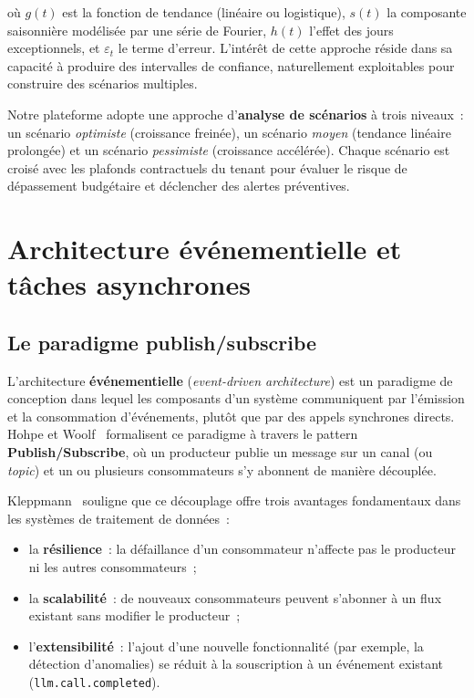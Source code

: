 \noindent où $g(t)$ est la fonction de tendance (linéaire ou logistique), $s(t)$ la composante saisonnière modélisée par une série de Fourier, $h(t)$ l'effet des jours exceptionnels, et $\varepsilon_t$ le terme d'erreur. L'intérêt de cette approche réside dans sa capacité à produire des intervalles de confiance, naturellement exploitables pour construire des scénarios multiples.

Notre plateforme adopte une approche d'\textbf{analyse de scénarios} à trois niveaux~: un scénario \textit{optimiste} (croissance freinée), un scénario \textit{moyen} (tendance linéaire prolongée) et un scénario \textit{pessimiste} (croissance accélérée). Chaque scénario est croisé avec les plafonds contractuels du tenant pour évaluer le risque de dépassement budgétaire et déclencher des alertes préventives.


\section{Architecture événementielle et tâches asynchrones}
\label{sec:eventdriven}

\subsection{Le paradigme publish/subscribe}

L'architecture \textbf{événementielle} (\textit{event-driven architecture}) est un paradigme de conception dans lequel les composants d'un système communiquent par l'émission et la consommation d'événements, plutôt que par des appels synchrones directs. Hohpe et Woolf~\cite{hohpe2003} formalisent ce paradigme à travers le pattern \textbf{Publish/Subscribe}, où un producteur publie un message sur un canal (ou \textit{topic}) et un ou plusieurs consommateurs s'y abonnent de manière découplée.

Kleppmann~\cite{kleppmann2017} souligne que ce découplage offre trois avantages fondamentaux dans les systèmes de traitement de données~:

\begin{itemize}[noitemsep]
    \item la \textbf{résilience}~: la défaillance d'un consommateur n'affecte pas le producteur ni les autres consommateurs~;
    \item la \textbf{scalabilité}~: de nouveaux consommateurs peuvent s'abonner à un flux existant sans modifier le producteur~;
    \item l'\textbf{extensibilité}~: l'ajout d'une nouvelle fonctionnalité (par exemple, la détection d'anomalies) se réduit à la souscription à un événement existant (\texttt{llm.call.completed}).
\end{itemize}

